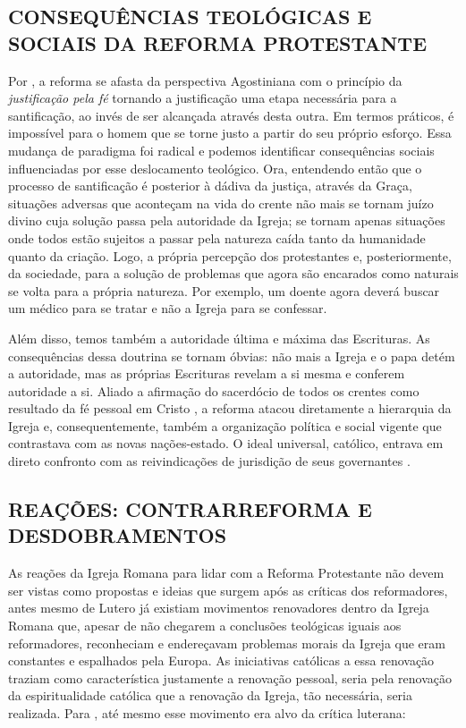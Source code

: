 \documentclass[
    article,            %
	12pt,				%
	oneside,			%
	a4paper,			%
	chapter=TITLE,		%
	section=TITLE,		%
	english,			%
	french,				%
	spanish,			%
	brazil				%
	]{abntex2}
\begin{document}
\subsection{CONSEQUÊNCIAS TEOLÓGICAS E SOCIAIS DA REFORMA PROTESTANTE}
Por , a reforma se afasta da perspectiva Agostiniana com o princípio da \emph{justificação pela fé} tornando a justificação uma etapa necessária para a santificação, ao invés de ser alcançada através desta outra. Em termos práticos, é impossível para o homem que se torne justo a partir do seu próprio esforço. Essa mudança de paradigma foi radical e podemos identificar consequências sociais influenciadas por esse deslocamento teológico. Ora, entendendo então que o processo de santificação é posterior à dádiva da justiça, através da Graça, situações adversas que aconteçam na vida do crente não mais se tornam juízo divino cuja solução passa pela autoridade da Igreja; se tornam apenas situações onde todos estão sujeitos a passar pela natureza caída tanto da humanidade quanto da criação. Logo, a própria percepção dos protestantes e, posteriormente, da sociedade, para a solução de problemas que agora são encarados como naturais se volta para a própria natureza. Por exemplo, um doente agora deverá buscar um médico para se tratar e não a Igreja para se confessar.

Além disso, temos também a autoridade última e máxima das Escrituras. As consequências dessa doutrina se tornam óbvias: não mais a Igreja e o papa detém a autoridade, mas as próprias Escrituras revelam a si mesma e conferem autoridade a si. Aliado a afirmação do sacerdócio de todos os crentes como resultado da fé pessoal em Cristo \cite[p.263]{CAIRNS}, a reforma atacou diretamente a hierarquia da Igreja e, consequentemente, também a organização política e social vigente que contrastava com as novas nações-estado. O ideal universal, católico, entrava em direto confronto com as reivindicações de jurisdição de seus governantes \cite[p.252]{CAIRNS}.

\subsection{REAÇÕES: CONTRARREFORMA E DESDOBRAMENTOS}
As reações da Igreja Romana para lidar com a Reforma Protestante não devem ser vistas como propostas e ideias que surgem após as críticas dos reformadores, antes mesmo de Lutero já existiam movimentos renovadores dentro da Igreja Romana que, apesar de não chegarem a conclusões teológicas iguais aos reformadores, reconheciam e endereçavam problemas morais da Igreja que eram constantes e espalhados pela Europa. As iniciativas católicas a essa renovação traziam como característica justamente a renovação pessoal, seria pela renovação da espiritualidade católica que a renovação da Igreja, tão necessária, seria realizada. Para , até mesmo esse movimento era alvo da crítica luterana:
\end{document}
